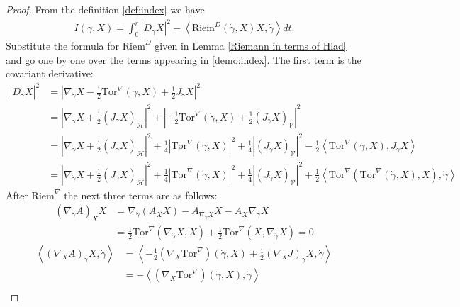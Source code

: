 \documentclass[11pt]{article}
\numberwithin{equation}{section}
\newcommand{\Riem}{\mathrm{Riem}}
\newcommand{\V}{\mathcal V}
\newcommand{\Tor}{\mathrm{Tor}}
\begin{document}
\begin{proof}
From the definition \eqref{def:index} we have
\begin{align}\label{demo:index}
I (\gamma,X)   =\int_0^r \left | D_{\dot \gamma}  X \right|^2 -\left \langle \mathrm{Riem}^D(\dot \gamma,X)X, \dot \gamma \right \rangle  dt.
\end{align}
Substitute the formula for $\mathrm{Riem}^D$ given in Lemma \ref{Riemann in terms of Hlad} and  go one by one over the terms appearing in \eqref{demo:index}. The first term is the covariant derivative:
\begin{align*}
| D_{\dot \gamma} X |^2&=  \left|\nabla_{\dot \gamma} X -\frac{1}{2} \Tor^\nabla (\dot \gamma,X)+\frac{1}{2} J_{\dot \gamma} X \right|^2 \\
 &=  \left|\nabla_{\dot \gamma} X +\frac{1}{2} (J_{\dot \gamma} X)_\mathcal{H} \right|^2+\left| -\frac{1}{2} \Tor^\nabla (\dot \gamma,X)+\frac{1}{2} (J_{\dot \gamma} X)_\V \right|^2 \\
 &=\left|\nabla_{\dot \gamma} X +\frac{1}{2} (J_{\dot \gamma} X)_\mathcal{H} \right|^2 +\frac{1}{4}\left| \Tor^\nabla (\dot \gamma,X)\right|^2+\frac{1}{4} \left| (J_{\dot \gamma} X)_\V \right|^2-\frac{1}{2} \left\langle \Tor^\nabla (\dot \gamma,X), J_{\dot \gamma} X \right\rangle \\
 &=\left|\nabla_{\dot \gamma} X +\frac{1}{2} (J_{\dot \gamma} X)_\mathcal{H} \right|^2 +\frac{1}{4}\left| \Tor^\nabla (\dot \gamma,X)\right|^2+\frac{1}{4} \left| (J_{\dot \gamma} X)_\V \right|^2+\frac{1}{2} \left\langle \Tor^\nabla (\Tor^\nabla (\dot \gamma,X),X), \dot \gamma \right\rangle
\end{align*}
After $\Riem^\nabla$ the next three terms are as follows:
\begin{align*}
(\nabla_{\dot \gamma} A)_X X&= \nabla_{\dot \gamma} (A_X X) -A_{\nabla_{\dot \gamma} X}X-A_X \nabla_{\dot \gamma} X \\
 &=\frac{1}{2} \Tor^\nabla (\nabla_{\dot \gamma} X,X)+\frac{1}{2} \Tor^\nabla (X, \nabla_{\dot \gamma} X)=0
\end{align*}
\begin{align*}
\left\langle (\nabla_{X} A)_{\dot \gamma} X,\dot \gamma \right\rangle&=\left\langle-\frac{1}{2} (\nabla_X \Tor^\nabla) (\dot \gamma ,X)+\frac{1}{2} (\nabla_X J)_{\dot \gamma} X, \dot \gamma \right\rangle\\
 &=-\left\langle(\nabla_X \Tor^\nabla) (\dot \gamma ,X), \dot \gamma \right\rangle
\end{align*}
\begin{align*}

\end{align*}
\end{proof}
\end{document}
